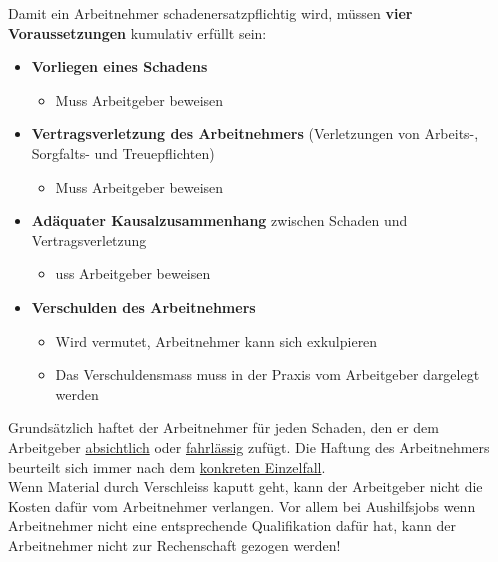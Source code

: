 Damit ein Arbeitnehmer schadenersatzpflichtig wird, müssen \textbf{vier Voraussetzungen} kumulativ erfüllt sein:
\begin{itemize}
    \item \textbf{Vorliegen eines Schadens}
    \begin{itemize}
        \item Muss Arbeitgeber beweisen
    \end{itemize}
    \item \textbf{Vertragsverletzung des Arbeitnehmers} (Verletzungen von Arbeits-, Sorgfalts- und Treuepflichten)
    \begin{itemize}
        \item Muss Arbeitgeber beweisen
    \end{itemize}
    \item \textbf{Adäquater Kausalzusammenhang} zwischen Schaden und Vertragsverletzung
    \begin{itemize}
        \item uss Arbeitgeber beweisen
    \end{itemize}
    \item \textbf{Verschulden des Arbeitnehmers}
    \begin{itemize}
        \item Wird vermutet, Arbeitnehmer kann sich exkulpieren
        \item Das Verschuldensmass muss in der Praxis vom Arbeitgeber dargelegt werden
    \end{itemize}
\end{itemize}

Grundsätzlich haftet der Arbeitnehmer für jeden Schaden, den er dem Arbeitgeber \underline{absichtlich} oder \underline{fahrlässig} zufügt. Die Haftung des Arbeitnehmers beurteilt sich immer nach dem \underline{konkreten Einzelfall}.\\

Wenn Material durch Verschleiss kaputt geht, kann der Arbeitgeber nicht die Kosten dafür vom Arbeitnehmer verlangen.
Vor allem bei Aushilfsjobs wenn Arbeitnehmer nicht eine entsprechende Qualifikation dafür hat, kann der Arbeitnehmer nicht zur Rechenschaft gezogen werden!

